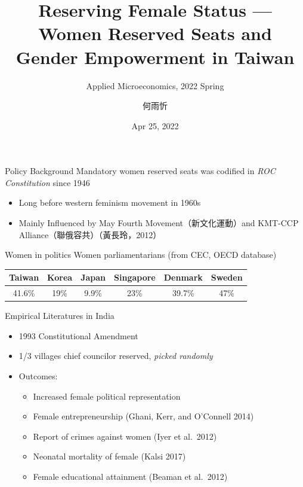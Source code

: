 \documentclass[
  10pt,
  ignorenonframetext,
  aspectratio=43,
]{beamer}
\title{Reserving Female Status --- Women Reserved Seats and Gender
Empowerment in Taiwan}
\subtitle{Applied Microeconomics, 2022 Spring}
\author{何雨忻}
\date{Apr 25, 2022}
\institute{Department of Economics, National Taiwan University}
\providecommand{\tightlist}{%
  \setlength{\itemsep}{0pt}\setlength{\parskip}{0pt}}
\begin{document}
\frame{\titlepage}

\begin{frame}{Policy Background}
\protect\hypertarget{policy-background}{}
Mandatory women reserved seats was codified in \emph{ROC Constitution}
since 1946

\begin{itemize}
\tightlist
\item
  Long before western feminism movement in 1960s
\item
  Mainly Influenced by May Fourth Movement（新文化運動）and KMT-CCP
  Alliance（聯俄容共）（黃長玲，2012）
\end{itemize}

\begin{block}{Women in politics}
\protect\hypertarget{women-in-politics}{}
Women parliamentarians (from CEC, OECD database)

\begin{longtable}[]{@{}cccccc@{}}
\toprule
Taiwan & Korea & Japan & Singapore & Denmark & Sweden \\
\midrule
\endhead
41.6\% & 19\% & 9.9\% & 23\% & 39.7\% & 47\% \\
\bottomrule
\end{longtable}
\end{block}
\end{frame}

\begin{frame}{Empirical Literatures in India}
\protect\hypertarget{empirical-literatures-in-india}{}
\begin{itemize}
\tightlist
\item
  1993 Constitutional Amendment
\item
  1/3 villages chief councilor reserved, \emph{picked randomly}
\item
  Outcomes:

  \begin{itemize}
  \tightlist
  \item
    Increased female political representation
  \item
    Female entrepreneurship \footnotesize (Ghani, Kerr, and O'Connell
    2014) \normalsize
  \item
    Report of crimes against women \footnotesize (Iyer et al.~2012)
    \normalsize
  \item
    Neonatal mortality of female \footnotesize (Kalsi 2017) \normalsize
  \item
    Female educational attainment \footnotesize (Beaman et al.~2012)
    \normalsize
  \end{itemize}
\end{itemize}
\end{frame}
\end{document}
